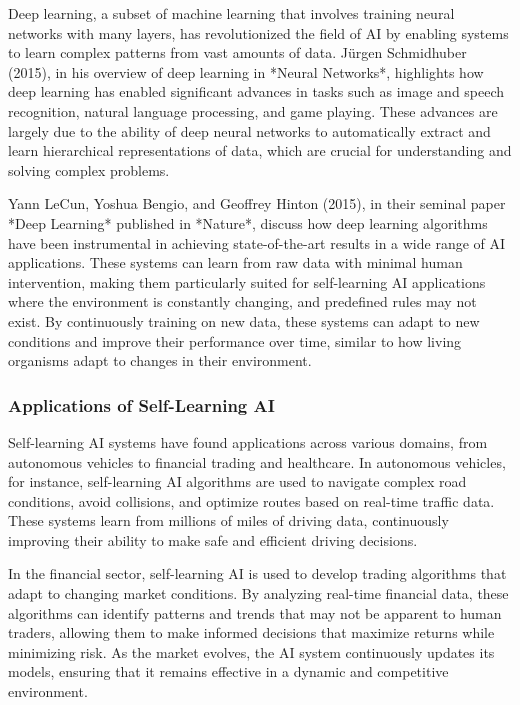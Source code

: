 \documentclass[12pt,twoside]{article}
\begin{document}
Deep learning, a subset of machine learning that involves training neural networks with many layers, has revolutionized the field of AI by enabling systems to learn complex patterns from vast amounts of data. Jürgen Schmidhuber (2015), in his overview of deep learning in *Neural Networks*, highlights how deep learning has enabled significant advances in tasks such as image and speech recognition, natural language processing, and game playing. These advances are largely due to the ability of deep neural networks to automatically extract and learn hierarchical representations of data, which are crucial for understanding and solving complex problems.

Yann LeCun, Yoshua Bengio, and Geoffrey Hinton (2015), in their seminal paper *Deep Learning* published in *Nature*, discuss how deep learning algorithms have been instrumental in achieving state-of-the-art results in a wide range of AI applications. These systems can learn from raw data with minimal human intervention, making them particularly suited for self-learning AI applications where the environment is constantly changing, and predefined rules may not exist. By continuously training on new data, these systems can adapt to new conditions and improve their performance over time, similar to how living organisms adapt to changes in their environment.

\subsubsection{Applications of Self-Learning AI}

Self-learning AI systems have found applications across various domains, from autonomous vehicles to financial trading and healthcare. In autonomous vehicles, for instance, self-learning AI algorithms are used to navigate complex road conditions, avoid collisions, and optimize routes based on real-time traffic data. These systems learn from millions of miles of driving data, continuously improving their ability to make safe and efficient driving decisions.

In the financial sector, self-learning AI is used to develop trading algorithms that adapt to changing market conditions. By analyzing real-time financial data, these algorithms can identify patterns and trends that may not be apparent to human traders, allowing them to make informed decisions that maximize returns while minimizing risk. As the market evolves, the AI system continuously updates its models, ensuring that it remains effective in a dynamic and competitive environment.
\end{document}
